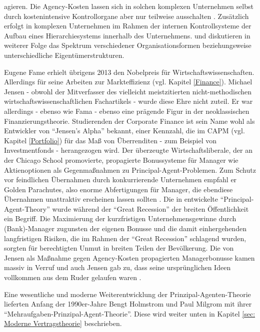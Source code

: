 agieren. Die Agency-Kosten lassen sich in solchen komplexen Unternehmen selbst durch kostenintensive Kontrollorgane aber nur teilweise ausschalten \parencite[S. 311]{Fama1983a}. Zusätzlich erfolgt in komplexen Unternehmen im Rahmen der internen Kontrollsysteme der Aufbau eines Hierarchiesystems innerhalb des Unternehmens. \textcite[S. 313ff]{Fama1983a} und \textcite{Fama1983b} diskutieren in weiterer Folge das Spektrum verschiedener Organisationsformen beziehungsweise unterschiedliche Eigentümerstrukturen.

Eugene Fame erhielt übrigens 2013 den Nobelpreis für Wirtschaftswissenschaften. Allerdings für seine Arbeiten zur Markteffizienz (vgl. Kapitel \ref{Finance}). Michael Jensen - obwohl der Mitverfasser des vielleicht meistzitierten nicht-methodischen wirtschaftswissenschaftlichen Fachartikels - wurde diese Ehre nicht zuteil. Er war allerdings - ebenso wie Fama - ebenso eine prägende Figur in der neoklassischen Finanzierungstheorie. Studierenden der Corporate Finance ist sein Name wohl als Entwickler von "`Jensen's Alpha"' bekannt, einer Kennzahl, die im CAPM (vgl. Kapitel \ref{Portfolio}) für das Maß von Überrenditen - zum Beispiel von Investmentfonds - herangezogen wird. Der überzeugte Wirtschaftsliberale, der an der Chicago School promovierte, propagierte Bonussysteme für Manager wie Aktienoptionen als Gegenmaßnahmen zu Principal-Agent-Problemen. Zum Schutz vor feindlichen Übernahmen durch konkurrierende Unternehmen empfahl er Golden Parachutes, also enorme Abfertigungen für Manager, die ebendiese Übernahmen unattraktiv erscheinen lassen sollten \parencite{Rosenwald2024}. Die in \textcite{Jensen1976} entwickelte "`Principal-Agent-Theory"' wurde während der "`Great Recession"' der breiten Öffentlichkeit ein Begriff. Die Maximierung der kurzfristigen Unternehmensgewinne durch (Bank)-Manager zugunsten der eigenen Bonusse und die damit einhergehenden langfristigen Risiken, die im Rahmen der "`Great Recession"' schlagend wurden, sorgten für berechtigten Unmut in breiten Teilen der Bevölkerung. Die von Jensen als Maßnahme gegen Agency-Kosten propagierten Managerbonusse kamen massiv in Verruf und auch Jensen gab zu, dass seine ursprünglichen Ideen vollkommen aus dem Ruder gelaufen waren \parencite{Jensen2010}.

Eine wesentliche und moderne Weiterentwicklung der Prinzipal-Agenten-Theorie lieferten Anfang der 1990er-Jahre Bengt Holmstrom und Paul Milgrom mit ihrer "`Mehraufgaben-Prinzipal-Agent-Theorie"'. Diese wird weiter unten in Kapitel \ref{sec: Moderne Vertragstheorie} beschrieben.

